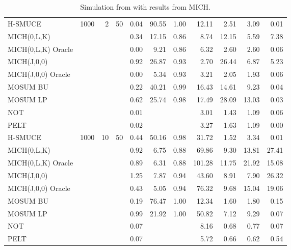 \begin{table}
\begin{tabular}{l| r r r r r r r r r r}
        H-SMUCE & 1000 & 2 & 50 & 0.04 & 90.55 & 1.00 & 12.11 & 2.51 & 3.09 & 0.01 \\
        MICH(0,L,K) &  &  &  & 0.34 & 17.15 & 0.86 & 8.74 & 12.15 & 5.59 & 7.38 \\
        MICH(0,L,K) Oracle &  &  &  & 0.00 & 9.21 & 0.86 & 6.32 & 2.60 & 2.60 & 0.06 \\
        MICH(J,0,0) &  &  &  & 0.92 & 26.87 & 0.93 & 2.70 & 26.44 & 6.87 & 5.23 \\
        MICH(J,0,0) Oracle &  &  &  & 0.00 & 5.34 & 0.93 & 3.21 & 2.05 & 1.93 & 0.06 \\
        MOSUM BU &  &  &  & 0.22 & 40.21 & 0.99 & 16.43 & 14.61 & 9.23 & 0.04 \\
        MOSUM LP &  &  &  & 0.62 & 25.74 & 0.98 & 17.49 & 28.09 & 13.03 & 0.03 \\
        NOT &  &  &  & 0.01 &  &  & 3.01 & 1.43 & 1.09 & 0.06 \\
        PELT &  &  &  & 0.02 &  &  & 3.27 & 1.63 & 1.09 & 0.00\\ \hline 

        H-SMUCE & 1000 & 10 & 50 & 0.44 & 50.16 & 0.98 & 31.72 & 1.52 & 3.34 & 0.01 \\
        MICH(0,L,K) &  &  &  & 0.92 & 6.75 & 0.88 & 69.86 & 9.30 & 13.81 & 27.41 \\
        MICH(0,L,K) Oracle &  &  &  & 0.89 & 6.31 & 0.88 & 101.28 & 11.75 & 21.92 & 15.08 \\
        MICH(J,0,0) &  &  &  & 1.25 & 7.87 & 0.94 & 43.60 & 8.91 & 7.90 & 26.32 \\
        MICH(J,0,0) Oracle &  &  &  & 0.43 & 5.05 & 0.94 & 76.32 & 9.68 & 15.04 & 19.06 \\
        MOSUM BU &  &  &  & 0.19 & 76.47 & 1.00 & 12.34 & 1.60 & 1.80 & 0.15 \\
        MOSUM LP &  &  &  & 0.99 & 21.92 & 1.00 & 50.82 & 7.12 & 9.29 & 0.07 \\
        NOT &  &  &  & 0.07 &  &  & 8.16 & 0.68 & 0.77 & 0.07 \\
        PELT &  &  &  & 0.07 &  &  & 5.72 & 0.66 & 0.62 & 0.54\\ \hline 
    \end{tabular}
    \caption{Simulation from \cite{Pein17} with results from MICH.}
    \label{tab:hsmuce-sim}
\end{table}
